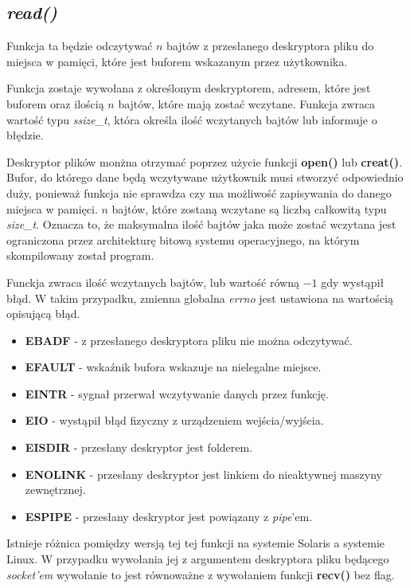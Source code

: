 \documentclass{article}
\begin{document}
\subsection{\textit{read()}}
Funkcja ta będzie odczytywać $n$ bajtów z przesłanego deskryptora pliku do miejsca w pamięci,
które jest buforem wskazanym przez użytkownika.

Funkcja zostaje wywołana z określonym deskryptorem, adresem, które jest buforem oraz ilością $n$ bajtów, które mają zostać wczytane. Funkcja zwraca wartość typu \textit{ssize\_t}, która określa ilość wczytanych bajtów lub informuje o błędzie.

Deskryptor plików monżna otrzymać poprzez użycie funkcji \textbf{open()} lub \textbf{creat()}.
Bufor, do którego dane będą wczytywane użytkownik musi stworzyć odpowiednio duży, ponieważ funkcja nie sprawdza czy ma możliwość zapisywania do danego miejsca w pamięci.
$n$ bajtów, które zostaną wczytane są liczbą całkowitą typu \textit{size\_t}.
Oznacza to, że maksymalna ilość bajtów jaka może zostać wczytana jest ograniczona przez architekturę bitową systemu operacyjnego, na którym skompilowany został program.

Funckja zwraca ilość wczytanych bajtów, lub wartość równą $-1$ gdy wystąpił błąd.
W takim przypadku, zmienna globalna \textit{errno} jest ustawiona na wartością opisującą błąd.

\begin{itemize}
\item \textbf{EBADF} - z przesłanego deskryptora pliku nie można odczytywać.
\item \textbf{EFAULT} - wskaźnik bufora wskazuje na nielegalne miejsce.
\item \textbf{EINTR} - sygnał przerwał wczytywanie danych przez funkcję.
\item \textbf{EIO} - wystąpił błąd fizyczny z urządzeniem wejścia/wyjścia.
\item \textbf{EISDIR} - przesłany deskryptor jest folderem.
\item \textbf{ENOLINK} - przesłany deskryptor jest linkiem do nieaktywnej maszyny zewnętrznej.
\item \textbf{ESPIPE} - przesłany deskryptor jest powiązany z \textit{pipe}'em.
\end{itemize}

Istnieje różnica pomiędzy wersją tej tej funkcji na systemie Solaris a systemie Linux.
W przypadku wywołania jej z argumentem deskryptora pliku będącego \textit{socket'em} wywołanie to jest równoważne z wywołaniem funkcji \textbf{recv()} bez flag.
\end{document}
